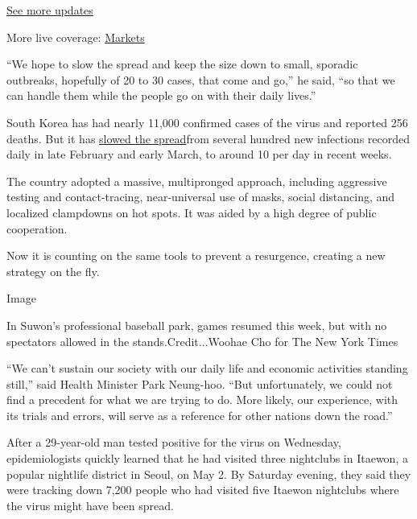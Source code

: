 \href{https://www.nytimes3xbfgragh.onion/2020/08/21/world/covid-19-coronavirus.html?action=click\&pgtype=Article\&state=default\&region=MAIN_CONTENT_1\&context=storylines_live_updates}{See
more updates}

More live coverage:
\href{https://www.nytimes3xbfgragh.onion/live/2020/08/20/business/stock-market-today-coronavirus?action=click\&pgtype=Article\&state=default\&region=MAIN_CONTENT_1\&context=storylines_live_updates}{Markets}

``We hope to slow the spread and keep the size down to small, sporadic
outbreaks, hopefully of 20 to 30 cases, that come and go,'' he said,
``so that we can handle them while the people go on with their daily
lives.''

South Korea has had nearly 11,000 confirmed cases of the virus and
reported 256 deaths. But it has
\href{https://www.nytimes3xbfgragh.onion/interactive/2020/03/19/world/coronavirus-flatten-the-curve-countries.html?searchResultPosition=360}{slowed
the spread}from several hundred new infections recorded daily in late
February and early March, to around 10 per day in recent weeks.

The country adopted a massive, multipronged approach, including
aggressive testing and contact-tracing, near-universal use of masks,
social distancing, and localized clampdowns on hot spots. It was aided
by a high degree of public cooperation.

Now it is counting on the same tools to prevent a resurgence, creating a
new strategy on the fly.

Image

In Suwon's professional baseball park, games resumed this week, but with
no spectators allowed in the stands.Credit...Woohae Cho for The New York
Times

``We can't sustain our society with our daily life and economic
activities standing still​,'' said Health Minister Park Neung-hoo.​
``But unfortunately, we could not find a precedent for what we are
trying to do​. More likely, our experience, with its trials and errors,
will serve as a reference for other nations​ down the road.''

After a 29-year-old man tested positive for the virus on Wednesday,
epidemiologists quickly learned that he had visited three nightclubs in
Itaewon, a popular nightlife district in Seoul, on May 2. By Saturday
evening, they said they were tracking down 7,200 people who had visited
five Itaewon nightclubs where the virus might have been spread.

